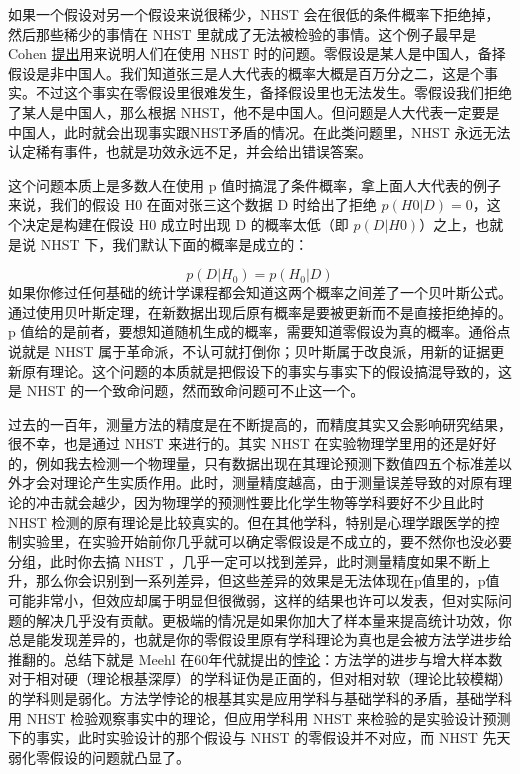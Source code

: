 \documentclass[]{tufte-book}
\begin{document}
如果一个假设对另一个假设来说很稀少，NHST 会在很低的条件概率下拒绝掉，然后那些稀少的事情在 NHST 里就成了无法被检验的事情。这个例子最早是 Cohen \href{http://ist-socrates.berkeley.edu/~maccoun/PP279_Cohen1.pdf}{提出}用来说明人们在使用 NHST 时的问题。零假设是某人是中国人，备择假设是非中国人。我们知道张三是人大代表的概率大概是百万分之二，这是个事实。不过这个事实在零假设里很难发生，备择假设里也无法发生。零假设我们拒绝了某人是中国人，那么根据 NHST，他不是中国人。但问题是人大代表一定要是中国人，此时就会出现事实跟NHST矛盾的情况。在此类问题里，NHST 永远无法认定稀有事件，也就是功效永远不足，并会给出错误答案。

这个问题本质上是多数人在使用 p 值时搞混了条件概率，拿上面人大代表的例子来说，我们的假设 H0 在面对张三这个数据 D 时给出了拒绝 \(p(H0|D) = 0\)，这个决定是构建在假设 H0 成立时出现 D 的概率太低（即 \(p(D|H0)\)）之上，也就是说 NHST 下，我们默认下面的概率是成立的：

\[
p(D|H_0) = p(H_0|D)
\]
如果你修过任何基础的统计学课程都会知道这两个概率之间差了一个贝叶斯公式。通过使用贝叶斯定理，在新数据出现后原有概率是要被更新而不是直接拒绝掉的。p 值给的是前者，要想知道随机生成的概率，需要知道零假设为真的概率。通俗点说就是 NHST 属于革命派，不认可就打倒你；贝叶斯属于改良派，用新的证据更新原有理论。这个问题的本质就是把假设下的事实与事实下的假设搞混导致的，这是 NHST 的一个致命问题，然而致命问题可不止这一个。

过去的一百年，测量方法的精度是在不断提高的，而精度其实又会影响研究结果，很不幸，也是通过 NHST 来进行的。其实 NHST 在实验物理学里用的还是好好的，例如我去检测一个物理量，只有数据出现在其理论预测下数值四五个标准差以外才会对理论产生实质作用。此时，测量精度越高，由于测量误差导致的对原有理论的冲击就会越少，因为物理学的预测性要比化学生物等学科要好不少且此时 NHST 检测的原有理论是比较真实的。但在其他学科，特别是心理学跟医学的控制实验里，在实验开始前你几乎就可以确定零假设是不成立的，要不然你也没必要分组，此时你去搞 NHST ，几乎一定可以找到差异，此时测量精度如果不断上升，那么你会识别到一系列差异，但这些差异的效果是无法体现在p值里的，p值可能非常小，但效应却属于明显但很微弱，这样的结果也许可以发表，但对实际问题的解决几乎没有贡献。更极端的情况是如果你加大了样本量来提高统计功效，你总是能发现差异的，也就是你的零假设里原有学科理论为真也是会被方法学进步给推翻的。总结下就是 Meehl 在60年代就提出的\href{https://philpapers.org/rec/MEETIP}{悖论}：方法学的进步与增大样本数对于相对硬（理论根基深厚）的学科证伪是正面的，但对相对软（理论比较模糊）的学科则是弱化。方法学悖论的根基其实是应用学科与基础学科的矛盾，基础学科用 NHST 检验观察事实中的理论，但应用学科用 NHST 来检验的是实验设计预测下的事实，此时实验设计的那个假设与 NHST 的零假设并不对应，而 NHST 先天弱化零假设的问题就凸显了。
\end{document}
